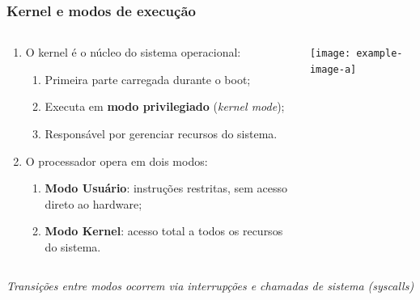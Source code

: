 \documentclass{beamer}
\begin{document}
\begin{frame}[fragile]
    \frametitle{Kernel e modos de execu\c{c}\~ao}

    \begin{columns}
        \begin{column}{0.55\textwidth}
            \begin{enumerate}\small
                \item O kernel \'{e} o n\'{u}cleo do sistema operacional:
                \begin{enumerate}\footnotesize
                    \item Primeira parte carregada durante o boot;
                    \item Executa em \textbf{modo privilegiado} (\textit{kernel mode});
                    \item Respons\'{a}vel por gerenciar recursos do sistema.
                \end{enumerate}
                \item O processador opera em dois modos:
                \begin{enumerate}\footnotesize
                    \item \textbf{Modo Usu\'{a}rio}: instru\c{c}\~oes restritas, sem acesso direto ao hardware;
                    \item \textbf{Modo Kernel}: acesso total a todos os recursos do sistema.
                \end{enumerate}
            \end{enumerate}
        \end{column}
        \begin{column}{0.45\textwidth}
            \begin{center}
                \texttt{[image: example-image-a]}
            \end{center}
        \end{column}
    \end{columns}

    \vfill
    \begin{center}
        \textit{Transi\c{c}\~oes entre modos ocorrem via interrup\c{c}\~oes e chamadas de sistema (syscalls)}
    \end{center}
\end{frame}
\end{document}
